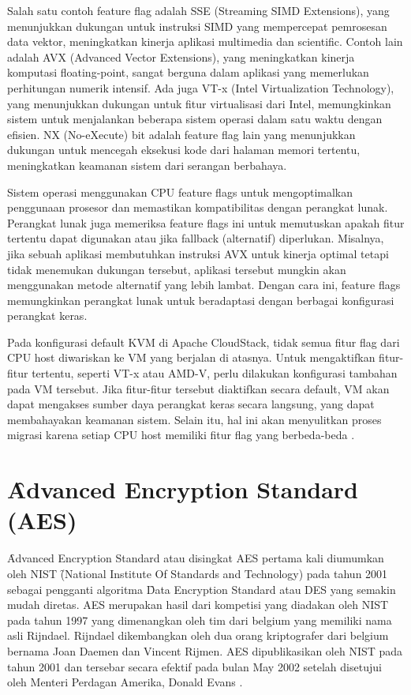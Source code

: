 Salah satu contoh feature flag adalah SSE (Streaming SIMD Extensions), yang menunjukkan dukungan untuk instruksi SIMD yang mempercepat pemrosesan data vektor, meningkatkan kinerja aplikasi multimedia dan scientific. Contoh lain adalah AVX (Advanced Vector Extensions), yang meningkatkan kinerja komputasi floating-point, sangat berguna dalam aplikasi yang memerlukan perhitungan numerik intensif. Ada juga VT-x (Intel Virtualization Technology), yang menunjukkan dukungan untuk fitur virtualisasi dari Intel, memungkinkan sistem untuk menjalankan beberapa sistem operasi dalam satu waktu dengan efisien. NX (No-eXecute) bit adalah feature flag lain yang menunjukkan dukungan untuk mencegah eksekusi kode dari halaman memori tertentu, meningkatkan keamanan sistem dari serangan berbahaya.

Sistem operasi menggunakan CPU feature flags untuk mengoptimalkan penggunaan prosesor dan memastikan kompatibilitas dengan perangkat lunak. Perangkat lunak juga memeriksa feature flags ini untuk memutuskan apakah fitur tertentu dapat digunakan atau jika fallback (alternatif) diperlukan. Misalnya, jika sebuah aplikasi membutuhkan instruksi AVX untuk kinerja optimal tetapi tidak menemukan dukungan tersebut, aplikasi tersebut mungkin akan menggunakan metode alternatif yang lebih lambat. Dengan cara ini, feature flags memungkinkan perangkat lunak untuk beradaptasi dengan berbagai konfigurasi perangkat keras.

Pada konfigurasi default KVM di Apache CloudStack, tidak semua fitur flag dari CPU host diwariskan ke VM yang berjalan di atasnya. Untuk mengaktifkan fitur-fitur tertentu, seperti VT-x atau AMD-V, perlu dilakukan konfigurasi tambahan pada VM tersebut. Jika fitur-fitur tersebut diaktifkan secara default, VM akan dapat mengakses sumber daya perangkat keras secara langsung, yang dapat membahayakan keamanan sistem. Selain itu, hal ini akan menyulitkan proses migrasi karena setiap CPU host memiliki fitur flag yang berbeda-beda \cite{apacheHostInstallation}.

\section{\f{Advanced Encryption Standard} (AES)}
\f{Advanced Encryption Standard} atau disingkat AES pertama kali diumumkan oleh NIST \f{(National Institute Of Standards and Technology)} pada tahun 2001 sebagai pengganti algoritma \f{Data Encryption Standard} atau DES yang semakin mudah diretas. AES merupakan hasil dari kompetisi yang diadakan oleh NIST pada tahun 1997 yang dimenangkan oleh tim dari belgium yang memiliki nama asli Rijndael. Rijndael dikembangkan oleh dua orang kriptografer dari belgium bernama Joan Daemen dan Vincent Rijmen. AES dipublikasikan oleh NIST pada tahun 2001 dan tersebar secara efektif pada bulan May 2002 setelah disetujui oleh Menteri Perdagan Amerika, Donald Evans \cite{Kaffahemailencryptaes}.


